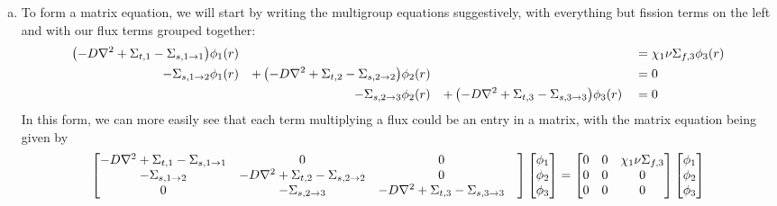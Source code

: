 \begin{enumerate}[a)]
\item

To form a matrix equation, we will start by writing the multigroup equations suggestively, with everything but fission terms on the left and with our flux terms grouped together:
\begin{align*}
\left(-D \nabla^2 + \Sigma_{t,1} - \Sigma_{s,1 \rightarrow 1}\right)&\phi_1(r) && && &&= \chi_1 \nu \Sigma_{f,3}\phi_{3}(r) \\
-\Sigma_{s,1 \rightarrow 2}&\phi_1(r) &+ \left(-D \nabla^2 + \Sigma_{t,2} - \Sigma_{s,2 \rightarrow 2}\right)&\phi_2(r) && &&= 0 \\
&&- \Sigma_{s,2 \rightarrow 3}&\phi_{2}(r) &+ \left(-D \nabla^2 + \Sigma_{t,3} - \Sigma_{s,3 \rightarrow 3}\right)&\phi_{3}(r) &&= 0 
\end{align*}
In this form, we can more easily see that each term multiplying a flux could be an entry in a 
matrix, with the matrix equation being given by
$$\begin{bmatrix}
-D \nabla^2 + \Sigma_{t,1} - \Sigma_{s,1 \rightarrow 1} & 0 & 0 \\
-\Sigma_{s,1 \rightarrow 2} & -D \nabla^2 + \Sigma_{t,2} - \Sigma_{s,2 \rightarrow 2} & 0 & \\
0 & - \Sigma_{s,2 \rightarrow 3} & -D \nabla^2 + \Sigma_{t,3} - \Sigma_{s,3 \rightarrow 3}
\end{bmatrix}\begin{bmatrix}
\phi_1 \\
\phi_2 \\
\phi_3
\end{bmatrix} = \begin{bmatrix}
0 & 0 & \chi_1 \nu \Sigma_{f,3} \\
0 & 0 & 0 \\
0 & 0 & 0
\end{bmatrix}\begin{bmatrix}
\phi_1 \\
\phi_2 \\
\phi_3
\end{bmatrix}$$
\end{enumerate}

